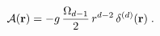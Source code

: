 \begin{equation}
{\mathcal A} ({\bf r})=
- g \,
\frac{ \Omega_{d-1}}{2}
\,
r^{d-2}
\,
\delta^{(d)} ({\bf r})
\;  .
\label{eq:time_rate_of_dilation_op_ddim_2D_ISP}
\end{equation}

